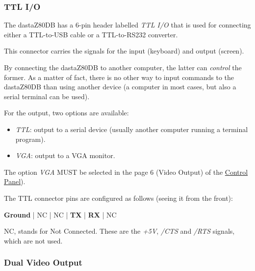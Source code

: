         \subsubsection{TTL I/O}
        \label{subsubsection:ttlio}

        The dastaZ80DB has a 6-pin header labelled \textit{TTL I/O} that is
        used for connecting either a TTL-to-USB cable or a TTL-to-RS232
        converter.

        This connector carries the signals for the input (keyboard) and output
        (screen).

        By connecting the dastaZ80DB to another computer, the latter can
        \textit{control} the former. As a matter of fact, there is no other way
        to input commands to the dastaZ80DB than using another device (a
        computer in most cases, but also a serial terminal can be used).

        For the output, two options are available:

        \begin{itemize}
            \item \textit{TTL}: output to a serial device (usually another
                computer running a terminal program).
            \item \textit{VGA}: output to a VGA monitor.
        \end{itemize}

        The option \textit{VGA} MUST be selected in the page 6 (Video Output) of
        the \hyperref[subsubsec:controlpanel]{Control Panel}).

        The TTL connector pins are configured as follows (seeing it from the
        front):

        \textbf{Ground} | NC | NC | \textbf{TX} | \textbf{RX} | NC

        NC, stands for Not Connected. These are the \textit{+5V}, \textit{/CTS}
        and \textit{/RTS} signals, which are not used.

        \subsubsection{Dual Video Output}

